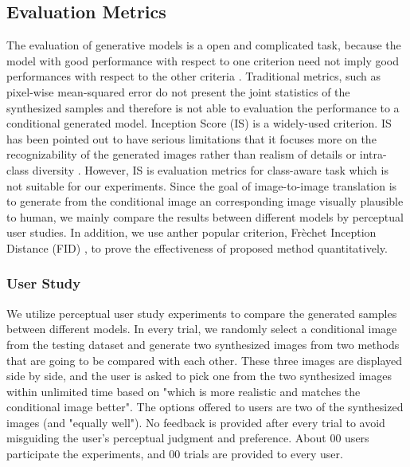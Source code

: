 \subsection{ Evaluation Metrics}
The evaluation of generative models is a open and complicated task, because the model with good performance with respect to one criterion need not imply good performances with respect to the other criteria \cite{evaluation, GANs_equal}. Traditional metrics, such as pixel-wise mean-squared error do not present the joint statistics of the synthesized samples and therefore is not able to evaluation the performance to a conditional generated model. 
Inception Score (IS) \cite{IS} is a widely-used criterion. IS has been pointed out to have serious limitations that it focuses more on the recognizability of the generated images rather than realism of details or intra-class diversity \cite{evaluation}. However, IS is evaluation metrics for class-aware task which is not suitable for our experiments. 
Since the goal of image-to-image translation is to generate from the conditional image an corresponding image visually plausible to human, we mainly compare the results between different models by perceptual user studies. 
In addition, we use anther popular criterion, Frèchet Inception Distance (FID) \cite{FID}, to prove the effectiveness of proposed method quantitatively. 
\subsubsection{User Study}
We utilize perceptual user study experiments to compare the generated samples between different models. In every trial, we randomly select a conditional image from the testing dataset and generate two synthesized images from two methods that are going to be compared with each other. These three images are displayed side by side, and the user is asked to pick one from the two synthesized images within unlimited time based on "which is more realistic and matches the conditional image better". The options offered to users are two of the synthesized images (and "equally well"). No feedback is provided after every trial to avoid misguiding the user's perceptual judgment and preference. About 00 users participate the experiments, and 00 trials are provided to every user. 
